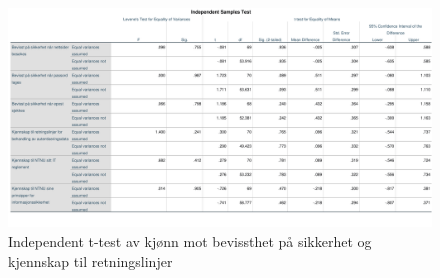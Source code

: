\begin{figure}[H]
    \centering
    \includegraphics[scale=0.4]{case_2/bilder/spss/anova_ttest/kjonn_bevissthetogkjennskap_ttest.pdf}
    \caption[kjonn-bevissthetogkjennskap-ttest]{Independent t-test av kjønn mot bevissthet på sikkerhet og kjennskap til retningslinjer}
    \label{fig:kjonn-bevissthetogkjennskap-ttest}
\end{figure}